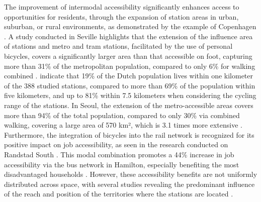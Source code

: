 \begin{refsegment}
The improvement of intermodal accessibility significantly enhances access to opportunities for residents, through the expansion of station areas in urban, suburban, or rural environments, as demonstrated by the example of Copenhagen \textcolor{blue}{\autocite[222]{djurhuus_building_2016}}. A study conducted in Seville highlights that the extension of the influence area of stations and metro and tram stations, facilitated by the use of personal bicycles, covers a significantly larger area than that accessible on foot, capturing more than 31\% of the metropolitan population, compared to only 6\% for walking combined \textcolor{blue}{\autocite[22]{marques_potential_2017}}. \textcolor{blue}{\textcite[213]{kager_characterisation_2016}} indicate that 19\% of the Dutch population lives within one kilometer of the 388 studied stations, compared to more than 69\% of the population within five kilometers, and up to 81\% within 7.5 kilometers when considering the cycling range of the stations. In Seoul, the extension of the metro-accessible areas covers more than 94\% of the total population, compared to only 30\% via combined walking, covering a large area of 570 km², which is 3.1 times more extensive \textcolor{blue}{\autocite[982]{lee_bicycle-based_2016}}. Furthermore, the integration of bicycles into the rail network is recognized for its positive impact on job accessibility, as seen in the research conducted on Randstad South \textcolor{blue}{\autocite[7]{geurs_multi-modal_2016}}. This modal combination promotes a 44\% increase in job accessibility via the bus network in Hamilton, especially benefiting the most disadvantaged households \textcolor{blue}{\autocite[10]{zuo_first-and-last_2020}}. However, these accessibility benefits are not uniformly distributed across space, with several studies revealing the predominant influence of the reach and position of the territories where the stations are located \textcolor{blue}{\autocite[9]{yu_understanding_2021}}.%


\end{refsegment}
